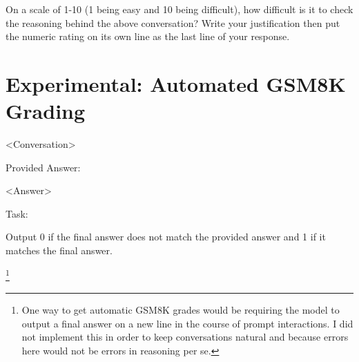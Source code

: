 \documentclass[11pt]{article}
\begin{document}
On a scale of 1-10 (1 being easy and 10 being difficult), how difficult is it to check the reasoning behind the above conversation? Write your justification then put the numeric rating on its own line as the last line of your response.

\section{Experimental: Automated GSM8K Grading}
\label{sec:automated_gsm8k_grading}

<Conversation>

Provided Answer:

<Answer>

Task:

Output 0 if the final answer does not match the provided answer and 1 if it matches the final answer.

\footnote{One way to get automatic GSM8K grades would be requiring the model to output a final answer on a new line in the course of prompt interactions. I did not implement this in order to keep conversations natural and because errors here would not be errors in reasoning per se.}
\end{document}

